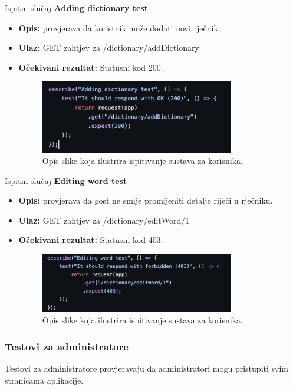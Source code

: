 			Ispitni slučaj \textbf{Adding dictionary test}
			\begin{itemize}
				\item \textbf{Opis:} provjerava da koristnik može dodati novi rječnik.
				\item \textbf{Ulaz:} GET zahtjev za /dictionary/addDictionary
				\item \textbf{Očekivani rezultat:} Statusni kod 200.
				\begin{figure}[h]
					\centering
					\includegraphics[width=0.8\textwidth]{slike/testovi/user_add_dictionary_test.png}
					\caption{Opis slike koja ilustrira ispitivanje sustava za korisnika.}
					\label{fig:testovi_korisnik_slika}
				\end{figure}
			\end{itemize}

			Ispitni slučaj \textbf{Editing word test}
			\begin{itemize}
				\item \textbf{Opis:} provjerava da gost ne smije promijeniti detalje riječi u rječniku.
				\item \textbf{Ulaz:} GET zahtjev za /dictionary/editWord/1
				\item \textbf{Očekivani rezultat:} Statusni kod 403.
				\begin{figure}[h]
					\centering
					\includegraphics[width=0.8\textwidth]{slike/testovi/user_edit_word_test.png}
					\caption{Opis slike koja ilustrira ispitivanje sustava za korisnika.}
					\label{fig:testovi_korisnik_slika}
				\end{figure}
			\end{itemize}

			\subsubsection{Testovi za administratore}
			Testovi za administratore provjeravaju da administratori mogu pristupiti svim
			stranicama aplikacije.
			\\

